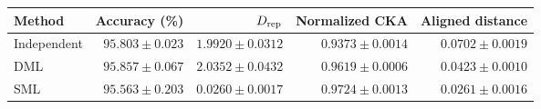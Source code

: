 \begin{tabular}{lrrrr}
\toprule
Method & Accuracy (\%) & $D_{\rm rep}$ & Normalized CKA & Aligned distance \\
\midrule
Independent & $95.803\pm0.023$ & $1.9920\pm0.0312$ & $0.9373\pm0.0014$ & $0.0702\pm0.0019$ \\
DML & $95.857\pm0.067$ & $2.0352\pm0.0432$ & $0.9619\pm0.0006$ & $0.0423\pm0.0010$ \\
SML & $95.563\pm0.203$ & $0.0260\pm0.0017$ & $0.9724\pm0.0013$ & $0.0261\pm0.0016$ \\
\bottomrule
\end{tabular}
